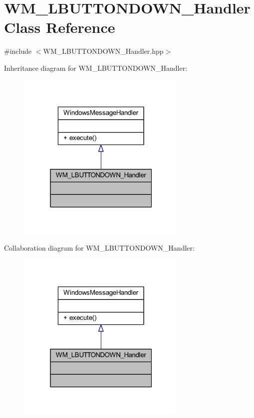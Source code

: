 \hypertarget{class_w_m___l_b_u_t_t_o_n_d_o_w_n___handler}{}\section{W\+M\+\_\+\+L\+B\+U\+T\+T\+O\+N\+D\+O\+W\+N\+\_\+\+Handler Class Reference}
\label{class_w_m___l_b_u_t_t_o_n_d_o_w_n___handler}


{\ttfamily \#include $<$W\+M\+\_\+\+L\+B\+U\+T\+T\+O\+N\+D\+O\+W\+N\+\_\+\+Handler.\+hpp$>$}



Inheritance diagram for W\+M\+\_\+\+L\+B\+U\+T\+T\+O\+N\+D\+O\+W\+N\+\_\+\+Handler\+:\nopagebreak
\begin{figure}[H]
\begin{center}
\leavevmode
\includegraphics[width=232pt]{class_w_m___l_b_u_t_t_o_n_d_o_w_n___handler__inherit__graph}
\end{center}
\end{figure}


Collaboration diagram for W\+M\+\_\+\+L\+B\+U\+T\+T\+O\+N\+D\+O\+W\+N\+\_\+\+Handler\+:\nopagebreak
\begin{figure}[H]
\begin{center}
\leavevmode
\includegraphics[width=232pt]{class_w_m___l_b_u_t_t_o_n_d_o_w_n___handler__coll__graph}
\end{center}
\end{figure}
